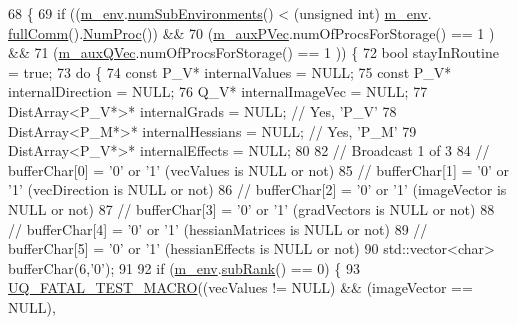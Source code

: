 \begin{DoxyCode}
68 \{
69   \textcolor{keywordflow}{if} ((\hyperlink{class_q_u_e_s_o_1_1_vector_function_synchronizer_a36c2a9e1a2d317dddb5cf51b68e5c659}{m\_env}.\hyperlink{class_q_u_e_s_o_1_1_base_environment_ac0345f57e31ef7833e379ed972bd094d}{numSubEnvironments}() < (\textcolor{keywordtype}{unsigned} int) \hyperlink{class_q_u_e_s_o_1_1_vector_function_synchronizer_a36c2a9e1a2d317dddb5cf51b68e5c659}{m\_env}.
      \hyperlink{class_q_u_e_s_o_1_1_base_environment_a0b0779b41ff304058856e97e1d16b4d4}{fullComm}().\hyperlink{class_q_u_e_s_o_1_1_mpi_comm_aa780721ae0fdeabc5a15e04cb0cad964}{NumProc}()) &&
70       (\hyperlink{class_q_u_e_s_o_1_1_vector_function_synchronizer_af93da0ecec2b078ddacc8135f81cd996}{m\_auxPVec}.numOfProcsForStorage() == 1                                 ) &&
71       (\hyperlink{class_q_u_e_s_o_1_1_vector_function_synchronizer_a4fc0f69d67bfcfc200484bb741a2b75d}{m\_auxQVec}.numOfProcsForStorage() == 1                                 )) \{
72     \textcolor{keywordtype}{bool} stayInRoutine = \textcolor{keyword}{true};
73     \textcolor{keywordflow}{do} \{
74       \textcolor{keyword}{const} P\_V*                    internalValues    = NULL;
75       \textcolor{keyword}{const} P\_V*                    internalDirection = NULL;
76             Q\_V*                    internalImageVec  = NULL;
77             DistArray<P\_V*>* internalGrads     = NULL; \textcolor{comment}{// Yes, 'P\_V'}
78             DistArray<P\_M*>* internalHessians  = NULL; \textcolor{comment}{// Yes, 'P\_M'}
79             DistArray<P\_V*>* internalEffects   = NULL;
80 
82       \textcolor{comment}{// Broadcast 1 of 3}
84 \textcolor{comment}{}      \textcolor{comment}{// bufferChar[0] = '0' or '1' (vecValues       is NULL or not)}
85       \textcolor{comment}{// bufferChar[1] = '0' or '1' (vecDirection    is NULL or not)}
86       \textcolor{comment}{// bufferChar[2] = '0' or '1' (imageVector     is NULL or not)}
87       \textcolor{comment}{// bufferChar[3] = '0' or '1' (gradVectors     is NULL or not)}
88       \textcolor{comment}{// bufferChar[4] = '0' or '1' (hessianMatrices is NULL or not)}
89       \textcolor{comment}{// bufferChar[5] = '0' or '1' (hessianEffects  is NULL or not)}
90       std::vector<char> bufferChar(6,\textcolor{charliteral}{'0'});
91 
92       \textcolor{keywordflow}{if} (\hyperlink{class_q_u_e_s_o_1_1_vector_function_synchronizer_a36c2a9e1a2d317dddb5cf51b68e5c659}{m\_env}.\hyperlink{class_q_u_e_s_o_1_1_base_environment_a172d52f993f1322ed45aaddf71518dbb}{subRank}() == 0) \{
93         \hyperlink{_defines_8h_a56d63d18d0a6d45757de47fcc06f574d}{UQ\_FATAL\_TEST\_MACRO}((vecValues != NULL) && (imageVector == NULL),

\end{DoxyCode}
